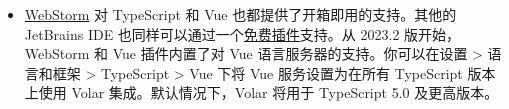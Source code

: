 \begin{paracol}{2}
\begin{itemize}
  强烈推荐 \href{https://code.visualstudio.com/}{Visual Studio Code}
  (VSCode)，因为它对 TypeScript 有着很好的内置支持。
  \begin{itemize}
  \item
    \href{https://marketplace.visualstudio.com/items?itemName=Vue.volar}{Volar}
    是官方的 VSCode 扩展，提供了 Vue 单文件组件中的 TypeScript
    支持，还伴随着一些其他非常棒的特性。
\begin{vueQuote}{TIP}
    Volar 取代了我们之前为 Vue 2 提供的官方 VSCode 扩展
    \href{https://marketplace.visualstudio.com/items?itemName=octref.vetur}{Vetur}。如果你之前已经安装了
    Vetur，请确保在 Vue 3 的项目中禁用它。
\end{vueQuote} 
  \item
    \href{https://marketplace.visualstudio.com/items?itemName=Vue.vscode-typescript-vue-plugin}{TypeScript
    Vue Plugin} 用于支持在 TS 中 import \texttt{*.vue} 文件。
  \end{itemize}
\item
  \href{https://www.jetbrains.com/webstorm/}{WebStorm} 对 TypeScript 和
  Vue 也都提供了开箱即用的支持。其他的 JetBrains IDE
  也同样可以通过一个\href{https://plugins.jetbrains.com/plugin/9442-vue-js}{免费插件}支持。从
  2023.2 版开始，WebStorm 和 Vue 插件内置了对 Vue
  语言服务器的支持。你可以在设置 \textgreater{} 语言和框架
  \textgreater{} TypeScript \textgreater{} Vue 下将 Vue 服务设置为在所有
  TypeScript 版本上使用 Volar 集成。默认情况下，Volar 将用于 TypeScript
  5.0 及更高版本。
\end{itemize}
\end{paracol}


